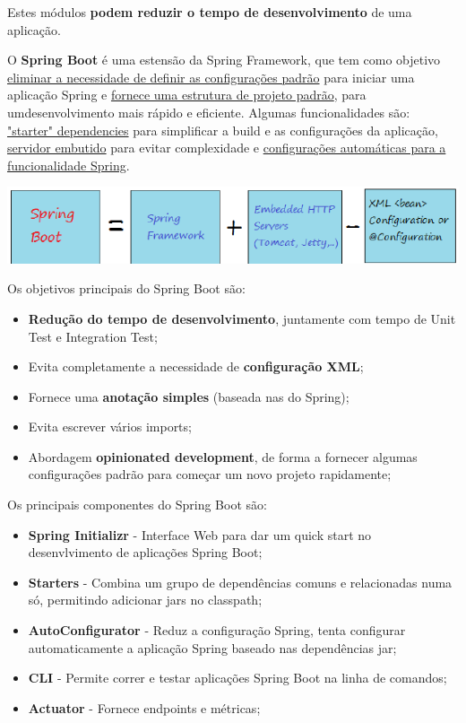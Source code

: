 \documentclass{article}
\begin{document}
Estes módulos \textbf{podem reduzir o tempo de desenvolvimento}
de uma aplicação.

\vspace{2mm}

O \textbf{Spring Boot} é uma estensão da Spring Framework, que tem como
objetivo \uline{eliminar a necessidade de definir as configurações padrão}
para iniciar uma aplicação Spring e \uline{fornece uma estrutura
de projeto padrão}, para umdesenvolvimento mais rápido e eficiente.
Algumas funcionalidades são: \uline{"starter" dependencies} para simplificar
a build e as configurações da aplicação, \uline{servidor embutido} para
evitar complexidade e \uline{configurações automáticas para a funcionalidade
Spring}.

\begin{center}
  \includegraphics[scale=0.5]{89}
\end{center}

\pagebreak

Os objetivos principais do Spring Boot são:
\begin{itemize}
  \item \textbf{Redução do tempo de desenvolvimento},
  juntamente com tempo de Unit Test e Integration Test;
  \item Evita completamente a necessidade de \textbf{configuração XML};
  \item Fornece uma \textbf{anotação simples} (baseada nas do Spring);
  \item Evita escrever vários imports;
  \item Abordagem \textbf{opinionated development}, de forma a fornecer
  algumas configurações padrão para começar um novo projeto rapidamente;
\end{itemize}

Os principais componentes do Spring Boot são:

\begin{itemize}
  \item \textbf{Spring Initializr} - Interface Web para dar um
  quick start no desenvlvimento de aplicações Spring Boot;
  \item \textbf{Starters} - Combina um grupo de dependências comuns
  e relacionadas numa só, permitindo adicionar jars no classpath;
  \item \textbf{AutoConfigurator} - Reduz a configuração Spring,
  tenta configurar automaticamente a aplicação Spring baseado
  nas dependências jar;
  \item \textbf{CLI} - Permite correr e testar aplicações Spring Boot na linha de comandos;
  \item \textbf{Actuator} - Fornece endpoints e métricas;
\end{itemize}
\end{document}
